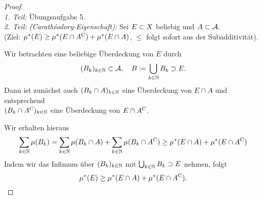 \documentclass[skript.tex]{subfiles}
\begin{document}
		\begin{proof}
			\hfill\\ %
			\emph{1. Teil:} Übungsaufgabe 5. \\
			\emph{2. Teil: (Carathéodory-Eigenschaft):}\quad
			Sei $E \subset X$ beliebig und $A \subset \mathcal{A}$. \\
			(Ziel: $\mu^*(E) \geq \mu^*(E \cap A^\mathrm{C}) + \mu^*(E \cap A)$,
			\quad$\leq$ folgt sofort aus der Subadditivität).
			
			Wir betrachten eine beliebige Überdeckung von $E$ durch
			\[
				(B_k)_{k\in\mathbb{N}} \subset \mathcal{A},\quad B \coloneqq \bigcup_{k\in\mathbb{N}} B_k \supset E.
			\]
			Dann ist zunächst auch $(B_k \cap A)_{k\in\mathbb{N}}$ eine Überdeckung von $E \cap A$
			und entsprechend \\ $(B_k \cap A^\mathrm{C})_{k\in\mathbb{N}}$ eine Überdeckung von $E \cap A^\mathrm{C}$.
			
			Wir erhalten hieraus
			\[
				\sum_{k\in\mathbb{N}} \mu(B_k) = \sum_{k\in\mathbb{N}} \mu(B_k \cap A) 
									+ \sum_{k\in\mathbb{N}} \mu(B_k \cap A^\mathrm{C})
					\geq \mu^*(E \cap A) + \mu^*(E \cap A^\mathrm{C})
			\]
			Indem wir das Infimum über $(B_k)_{k\in\mathbb{N}}$ mit $\bigcup_{k\in\mathbb{N}} B_k \supset E$ nehmen,
			folgt 
			\[
				\mu^*(E) \geq \mu^*(E \cap A) + \mu^*(E \cap A^\mathrm{C}).
			\]
		\end{proof}
		
\end{document}
